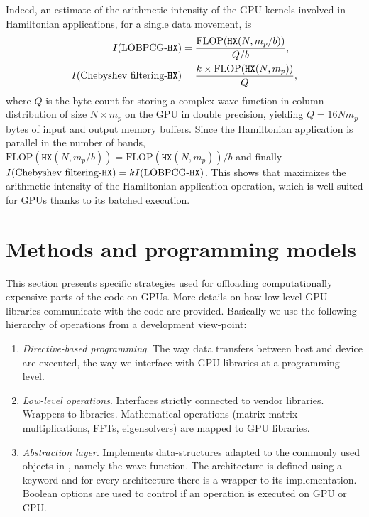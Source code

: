 \documentclass[twocolumn,superscriptaddress]{revtex4-1}
\begin{document}
Indeed, an estimate of the arithmetic intensity of the GPU kernels involved in Hamiltonian applications, for a single data movement, is
\begin{align*}
    I(\text{\lobpcg-}\texttt{HX}) &= \frac{\text{FLOP}(\texttt{HX}(N,m_p/b))}{Q/b},\\
    I(\text{\chebyshevfiltering-}\texttt{HX}) &= \frac{k\times\text{FLOP}(\texttt{HX}(N,m_p))}{Q},
\end{align*}
where $Q$ is the byte count for storing a complex wave function in column-distribution of size $N\times m_p$ on the GPU in double precision, yielding $Q=16Nm_p$ bytes of input and output memory buffers. Since the Hamiltonian application is parallel in the number of bands, $\text{FLOP}(\texttt{HX}(N,m_p/b))=\text{FLOP}(\texttt{HX}(N,m_p))/b$ and finally $I(\text{\chebyshevfiltering-}\texttt{HX}) = k I(\text{LOBPCG-}\texttt{HX})$. This shows that \chebyshevfiltering maximizes the arithmetic intensity of the Hamiltonian application operation, which is well suited for GPUs thanks to its batched execution.

\section{Methods and programming models}\label{sec:methods}

This section presents specific strategies used for offloading computationally expensive parts of the code on GPUs. More details on how low-level GPU libraries communicate with the \abinit code are provided. Basically we use the following hierarchy of operations from a development view-point:
\begin{enumerate}
    \item \textit{Directive-based programming}. The\textit{} way data transfers between host and device are executed, the way we interface with GPU libraries at a programming level.
    \item \textit{Low-level operations}. Interfaces strictly connected to vendor libraries. Wrappers to libraries. Mathematical operations (matrix-matrix multiplications, FFTs, eigensolvers) are mapped to GPU libraries.
    \item \textit{Abstraction layer}. Implements data-structures adapted to the commonly used objects in \abinit, namely the wave-function. The architecture is defined using a keyword and for every architecture there is a wrapper to its implementation. Boolean options are used to control if an operation is executed on GPU or CPU.
\end{enumerate}
\end{document}
